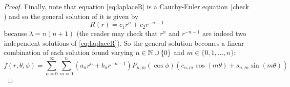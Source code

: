 \documentclass[../main.tex]{subfiles}
\begin{document}
\begin{proof}
  Finally, note that equation \cref{eq:laplaceR} is a Cauchy-Euler equation (check \cite{wiki:cauchy-euler}) and so the general solution of it is given by
  \begin{equation}
    R(r) = c_1 r^{n} + c_2 r^{-n-1}
  \end{equation}
  because $\lambda = n(n+1)$ (the reader may check that $r^n$ and $r^{-n-1}$ are indeed two independent solutions of \cref{eq:laplaceR}). So the general solution becomes a linear combination of each solution found varying $n\in\mathbb{N}\cup\{0\}$ and $m\in\{0,1,\dots,n\}$:
  \begin{equation}
    f(r,\theta,\phi) = \sum_{n=0}^\infty \sum_{m=0}^n (a_n r^{n} +b_{n}r^{-n-1})P_{n,m}(\cos\phi) (c_{n,m}\cos(m\theta)+s_{n,m}\sin(m\theta))
  \end{equation}
\end{proof}
\end{document}
